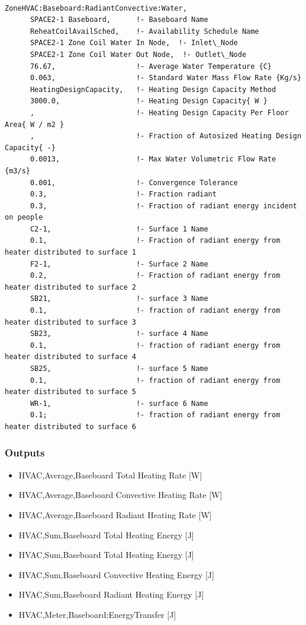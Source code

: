 \begin{lstlisting}

ZoneHVAC:Baseboard:RadiantConvective:Water,
      SPACE2-1 Baseboard,      !- Baseboard Name
      ReheatCoilAvailSched,    !- Availability Schedule Name
      SPACE2-1 Zone Coil Water In Node,  !- Inlet\_Node
      SPACE2-1 Zone Coil Water Out Node,  !- Outlet\_Node
      76.67,                   !- Average Water Temperature {C}
      0.063,                   !- Standard Water Mass Flow Rate {Kg/s}
      HeatingDesignCapacity,   !- Heating Design Capacity Method
      3000.0,                  !- Heating Design Capacity{ W }
      ,                        !- Heating Design Capacity Per Floor Area{ W / m2 }
      ,                        !- Fraction of Autosized Heating Design Capacity{ -}
      0.0013,                  !- Max Water Volumetric Flow Rate {m3/s}
      0.001,                   !- Convergence Tolerance
      0.3,                     !- Fraction radiant
      0.3,                     !- Fraction of radiant energy incident on people
      C2-1,                    !- Surface 1 Name
      0.1,                     !- Fraction of radiant energy from heater distributed to surface 1
      F2-1,                    !- Surface 2 Name
      0.2,                     !- Fraction of radiant energy from heater distributed to surface 2
      SB21,                    !- surface 3 Name
      0.1,                     !- fraction of radiant energy from heater distributed to surface 3
      SB23,                    !- surface 4 Name
      0.1,                     !- fraction of radiant energy from heater distributed to surface 4
      SB25,                    !- surface 5 Name
      0.1,                     !- fraction of radiant energy from heater distributed to surface 5
      WR-1,                    !- surface 6 Name
      0.1;                     !- fraction of radiant energy from heater distributed to surface 6
\end{lstlisting}

\subsubsection{Outputs}\label{outputs-027}

\begin{itemize}
\item
  HVAC,Average,Baseboard Total Heating Rate {[}W{]}
\item
  HVAC,Average,Baseboard Convective Heating Rate {[}W{]}
\item
  HVAC,Average,Baseboard Radiant Heating Rate {[}W{]}
\item
  HVAC,Sum,Baseboard Total Heating Energy {[}J{]}
\item
  HVAC,Sum,Baseboard Total Heating Energy {[}J{]}
\item
  HVAC,Sum,Baseboard Convective Heating Energy {[}J{]}
\item
  HVAC,Sum,Baseboard Radiant Heating Energy {[}J{]}
\item
  HVAC,Meter,Baseboard:EnergyTransfer {[}J{]}
\end{itemize}

